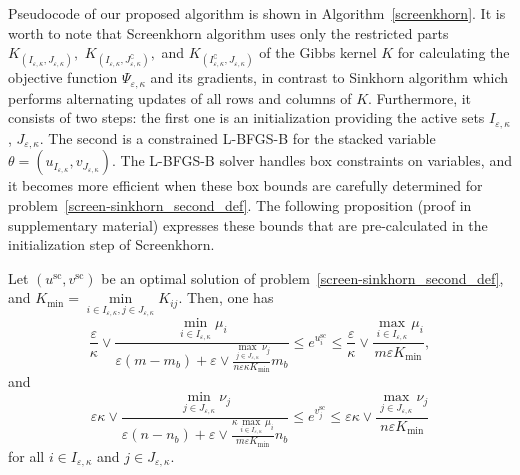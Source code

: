 Pseudocode of our proposed algorithm is shown in Algorithm~\ref{screenkhorn}. %
It is worth to note that Screenkhorn algorithm uses only the restricted parts $K_{(I_{\varepsilon,\kappa}, J_{\varepsilon,\kappa})},$ $K_{(I_{\varepsilon,\kappa}, J^\complement_{\varepsilon,\kappa})},$ and $K_{(I^\complement_{\varepsilon,\kappa}, J_{\varepsilon,\kappa})}$ of the Gibbs kernel $K$ for calculating the objective function $\Psi_{\varepsilon, \kappa}$ and its gradients, in contrast to Sinkhorn algorithm which performs alternating updates of all rows and columns of $K.$
Furthermore, it consists of two steps: the first one is an initialization providing the active sets $I_{\varepsilon,\kappa}$, $J_{\varepsilon,\kappa}$. 
The second is a constrained L-BFGS-B for the stacked variable $\theta=(u_{I_{\varepsilon,\kappa}},v_{J_{\varepsilon,\kappa}}).$ 
The L-BFGS-B solver handles box constraints on variables, and it becomes more efficient when these box bounds are carefully determined for problem~\eqref{screen-sinkhorn_second_def}. 
The following proposition (proof in supplementary material) expresses these bounds that are pre-calculated in the initialization step of Screenkhorn.

\begin{proposition}
\label{prop:bounds_of_usc_and_vsc}
Let $(u^{\text{sc}}, v^{\text{sc}})$ be an optimal solution of problem~\eqref{screen-sinkhorn_second_def}, and $K_{\min} = \min\limits_{i\in I_{\varepsilon,\kappa},j \in J_{\varepsilon,\kappa}}K_{ij}$. Then,
one has
\begin{equation}
\label{bound_on_u}
\frac \varepsilon\kappa \vee \frac{\min_{i \in I_{\varepsilon,\kappa}}\mu_i}{\varepsilon (m- m_b) + \varepsilon \vee \frac{\max_{j\in J_{\varepsilon,\kappa}} \nu_j}{n\varepsilon\kappa K_{\min}} m_b} \leq e^{u^{\text{sc}}_i} \leq \frac \varepsilon\kappa\vee \frac{\max_{i \in I_{\varepsilon,\kappa}} \mu_i}{m\varepsilon K_{\min}},
\end{equation}
and
\begin{equation}
\label{bound_on_v}
\varepsilon\kappa \vee \frac{\min_{j \in J_{\varepsilon,\kappa}}\nu_j}{\varepsilon(n- n_b) + \varepsilon \vee \frac{\kappa\max_{i\in I_{\varepsilon,\kappa}} \mu_i}{m\varepsilon K_{\min} } n_b} \leq e^{v^{\text{sc}}_j} \leq \varepsilon\kappa \vee \frac{\max_{j \in J_{\varepsilon,\kappa}} \nu_j}{n\varepsilon K_{\min} }
\end{equation}
for all $i\in I_{\varepsilon,\kappa}$ and $j\in J_{\varepsilon,\kappa}$.
\end{proposition}

